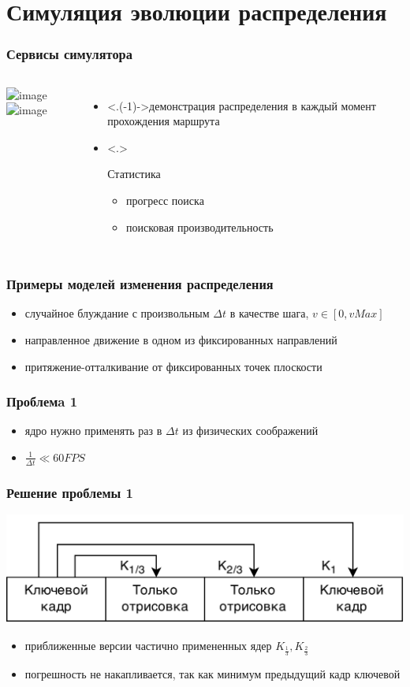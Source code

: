 \documentclass{beamer} %
\theoremstyle{definition} %
\def\putImg<#1>#2{ \includegraphics<#1>[width=\textwidth]{pics/#2} }
\begin{document}
\section{Симуляция эволюции распределения} %
\begin{frame}
  \frametitle{Сервисы симулятора}
\begin{columns}
\putImg<+>{pic08-1.png}
\putImg<+>{pic08-2.png}
\begin{itemize}
\item<.(-1)->{демонстрация распределения в каждый момент прохождения маршрута}
\item<.>{Статистика
\begin{itemize}
  \item{\color{red} прогресс поиска}
  \item{\color{blue} поисковая производительность}
\end{itemize}
}
\end{itemize}
\end{columns}
\end{frame}

\begin{frame} 
\frametitle{Примеры моделей изменения распределения}
\begin{itemize}
\item{случайное блуждание с произвольным $\Delta t$ в качестве шага, $v \in [0, vMax]$}
\item{направленное движение в одном из фиксированных направлений}
\item{притяжение-отталкивание от фиксированных точек плоскости}
\end{itemize}
\end{frame}

\begin{frame}
\frametitle{Проблемa 1}
\begin{itemize}
  \item{ядро нужно применять раз в $\Delta t$ из физических соображений}
  \item{$\frac{1}{\Delta t} \ll 60FPS$} 
\end{itemize}
\end{frame}

\begin{frame}
\frametitle{Решение проблемы 1}
\includegraphics[width=\textwidth]{pics/keyframe.png} 
\begin{itemize}
  \item{приближенные версии частично примененных ядер $K_{\frac{1}{3}}, K_{\frac{2}{3}}$}
  \item{погрешность не накапливается, так как минимум предыдущий кадр ключевой}
\end{itemize}
\end{frame}
\end{document}
